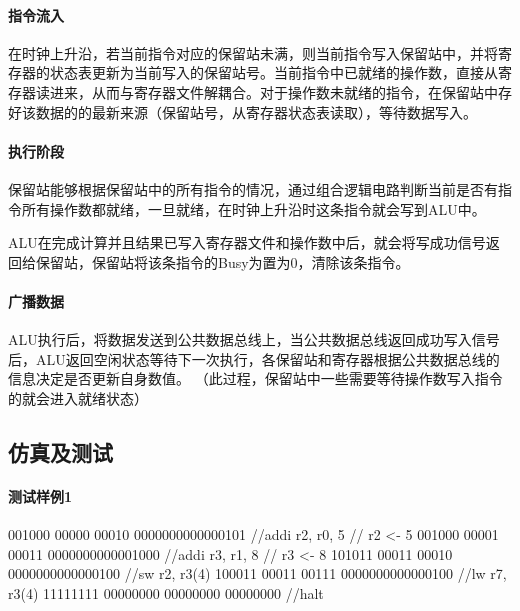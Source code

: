 \documentclass[twoside]{article}
\begin{document}
\paragraph{指令流入}
在时钟上升沿，若当前指令对应的保留站未满，则当前指令写入保留站中，并将寄存器的状态表更新为当前写入的保留站号。当前指令中已就绪的操作数，直接从寄存器读进来，从而与寄存器文件解耦合。对于操作数未就绪的指令，在保留站中存好该数据的的最新来源（保留站号，从寄存器状态表读取），等待数据写入。

\paragraph{执行阶段}
保留站能够根据保留站中的所有指令的情况，通过组合逻辑电路判断当前是否有指令所有操作数都就绪，一旦就绪，在时钟上升沿时这条指令就会写到ALU中。

ALU在完成计算并且结果已写入寄存器文件和操作数中后，就会将写成功信号返回给保留站，保留站将该条指令的Busy为置为0，清除该条指令。

\paragraph{广播数据}
ALU执行后，将数据发送到公共数据总线上，当公共数据总线返回成功写入信号后，ALU返回空闲状态等待下一次执行，各保留站和寄存器根据公共数据总线的信息决定是否更新自身数值。
（此过程，保留站中一些需要等待操作数写入指令的就会进入就绪状态）




\subsection{仿真及测试}

\paragraph{测试样例1}

\begin{verilogcode}
    001000 00000 00010 0000000000000101 //addi r2, r0, 5 // r2 <- 5
    001000 00001 00011 0000000000001000 //addi r3, r1, 8 // r3 <- 8
    101011 00011 00010 0000000000000100 //sw r2, r3(4)
    100011 00011 00111 0000000000000100 //lw r7, r3(4)
    11111111 00000000 00000000 00000000 //halt
\end{verilogcode}
\end{document}
